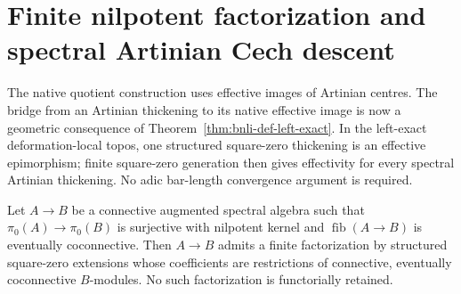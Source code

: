 \section{Finite nilpotent factorization and spectral Artinian Cech descent}
\label{sec:bnli-artinian-cech-descent}

The native quotient construction uses effective images of Artinian centres.
The bridge from an Artinian thickening to its native effective image is now a
geometric consequence of Theorem~\ref{thm:bnli-def-left-exact}.  In the
left-exact deformation-local topos, one structured square-zero thickening is
an effective epimorphism; finite square-zero generation then gives effectivity
for every spectral Artinian thickening.  No adic bar-length convergence
argument is required.

\begin{proposition}
\label{prop:bnli-unrestricted-finite-square-zero}
Let $A\to B$ be a connective augmented spectral algebra such that
$\pi_0(A)\to\pi_0(B)$ is surjective with nilpotent kernel and
$\operatorname{fib}(A\to B)$ is eventually coconnective.  Then $A\to B$
admits a finite factorization by structured square-zero extensions whose
coefficients are restrictions of connective, eventually coconnective
$B$-modules.  No such factorization is functorially retained.
\end{proposition}

